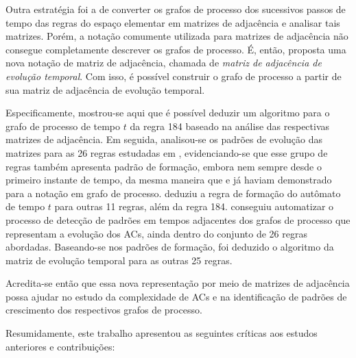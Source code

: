 \documentclass[12pt,a4paper]{article}
\begin{document}
Outra estratégia foi a de converter os grafos de processo dos sucessivos
passos de tempo das regras do espaço elementar em matrizes de adjacência e analisar
tais matrizes. Porém, a notação comumente utilizada para matrizes de adjacência
não consegue completamente descrever os grafos de processo. É, então, proposta uma
nova notação de matriz de adjacência, chamada de \textit{matriz de
adjacência de evolução temporal}. Com isso, é possível construir o
grafo de processo a partir de sua matriz de adjacência de evolução temporal.

Especificamente, mostrou-se aqui que é possível deduzir um algoritmo para o
grafo de processo de tempo $t$ da regra 184 baseado na análise das respectivas
matrizes de adjacência. Em seguida, analisou-se
os padrões de evolução das matrizes para as 26 regras estudadas em
, evidenciando-se que esse grupo de regras
também apresenta padrão de formação, embora nem sempre desde o primeiro
instante de tempo, da mesma maneira que  e
 já haviam demonstrado para a notação em grafo de processo.
 deduziu a regra de formação do autômato de
tempo $t$ para outras 11 regras, além da regra 184. 
conseguiu automatizar o processo de detecção de padrões em tempos adjacentes
dos grafos de processo que representam a evolução dos ACs, ainda dentro do
conjunto de 26 regras abordadas. Baseando-se nos padrões de formação, foi
deduzido o algoritmo da matriz de evolução temporal para as outras 25 regras.

Acredita-se então que essa nova representação por meio de matrizes de
adjacência possa ajudar no estudo da complexidade de ACs e na identificação
de padrões de crescimento dos respectivos grafos de processo.

Resumidamente, este trabalho apresentou as seguintes críticas aos estudos
anteriores e contribuições:
\end{document}
